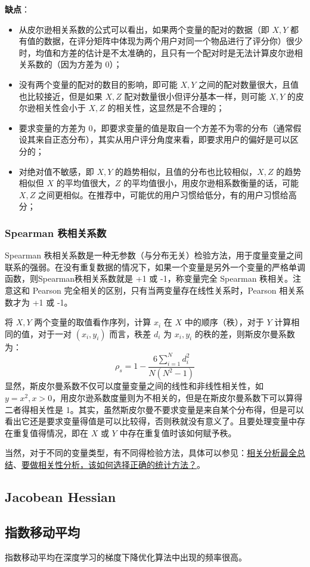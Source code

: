 \textbf{缺点}：
\begin{itemize}
	\item 从皮尔逊相关系数的公式可以看出，如果两个变量的配对的数据（即 $X, Y$ 都有值的数据，在评分矩阵中体现为两个用户对同一个物品进行了评分你）很少时，均值和方差的估计是不太准确的，且只有一个配对时是无法计算皮尔逊相关系数的（因为方差为 0）；
	\item 没有两个变量的配对的数目的影响，即可能 $X, Y$ 之间的配对数量很大，且值也比较接近，但是如果 $X, Z$ 配对数量很小但评分基本一样，则可能 $X, Y$ 的皮尔逊相关性会小于 $X, Z$ 的相关性，这显然是不合理的；
	\item 要求变量的方差为 0，即要求变量的值是取自一个方差不为零的分布（通常假设其来自正态分布），其实从用户评分角度来看，即要求用户的偏好是可以区分的；
	\item 对绝对值不敏感，即 $X, Y$ 的趋势相似，且值的分布也比较相似，$X, Z$ 的趋势相似但 $X$ 的平均值很大，$Z$ 的平均值很小，用皮尔逊相系数衡量的话，可能 $X, Z$ 之间更相似。在推荐中，可能优的用户习惯给低分，有的用户习惯给高分； 
\end{itemize}

\subsubsection{Spearman 秩相关系数}
Spearman 秩相关系数是一种无参数（与分布无关）检验方法，用于度量变量之间联系的强弱。在没有重复数据的情况下，如果一个变量是另外一个变量的严格单调函数，则Spearman秩相关系数就是 +1 或 -1，称变量完全 Spearman 秩相关。注意这和 Pearson 完全相关的区别，只有当两变量存在线性关系时，Pearson 相关系数才为 +1 或 -1。

将 $X, Y$ 两个变量的取值看作序列，计算 $x_i$ 在 $X$ 中的顺序（秩），对于 $Y$ 计算相同的值，对于一对 $(x_i, y_i)$ 而言，秩差 $d_i$ 为 $x_i, y_i$ 的秩的差，则斯皮尔曼系数为：
$$
\rho_{s} = 1 - \frac{6 \sum_{i=1}^N d_i^2}{N(N^2 - 1)}
$$
显然，斯皮尔曼系数不仅可以度量变量之间的线性和非线性相关性，如 $y = x^2, x > 0$，用皮尔逊系数度量则为不相关的，但是在斯皮尔曼系数下可以算得二者得相关性是 1。其实，虽然斯皮尔曼不要求变量是来自某个分布得，但是可以看出它还是要求变量得值是可以比较得，否则秩就没有意义了。且要处理变量中存在重复值得情况，即在 $X$ 或 $Y$ 中存在重复值时该如何赋予秩。

当然，对于不同的变量类型，有不同得检验方法，具体可以参见：\href{https://zhuanlan.zhihu.com/p/396580986}{相关分析最全总结}、\href{https://zhuanlan.zhihu.com/p/94070722}{要做相关性分析，该如何选择正确的统计方法？}。

\subsection{Jacobean Hessian}

\subsection{指数移动平均}
指数移动平均在深度学习的梯度下降优化算法中出现的频率很高。